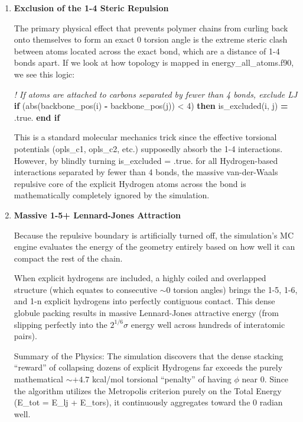 \documentclass[
]{article}
\newenvironment{Shaded}{}{}
\newcommand{\BuiltInTok}[1]{\textcolor[rgb]{0.00,0.50,0.00}{#1}}
\newcommand{\CommentTok}[1]{\textcolor[rgb]{0.38,0.63,0.69}{\textit{#1}}}
\newcommand{\ConstantTok}[1]{\textcolor[rgb]{0.53,0.00,0.00}{#1}}
\newcommand{\DecValTok}[1]{\textcolor[rgb]{0.25,0.63,0.44}{#1}}
\newcommand{\KeywordTok}[1]{\textcolor[rgb]{0.00,0.44,0.13}{\textbf{#1}}}
\newcommand{\NormalTok}[1]{#1}
\newcommand{\OperatorTok}[1]{\textcolor[rgb]{0.40,0.40,0.40}{#1}}
\begin{document}
\begin{enumerate}
\def\labelenumi{\arabic{enumi}.}
\item
  \textbf{Exclusion of the 1-4 Steric Repulsion}

  The primary physical effect that prevents polymer chains from curling
  back onto themselves to form an exact \(0\) torsion angle is the
  extreme steric clash between atoms located across the exact bond,
  which are a distance of 1-4 bonds apart. If we look at how topology is
  mapped in energy\_all\_atoms.f90, we see this logic:

\begin{Shaded}
\begin{Highlighting}[]
\CommentTok{! If atoms are attached to carbons separated by fewer than 4 bonds, exclude LJ}
\KeywordTok{if}\NormalTok{ (}\BuiltInTok{abs}\NormalTok{(backbone\_pos(i) }\KeywordTok{{-}}\NormalTok{ backbone\_pos(j)) }\OperatorTok{\textless{}} \DecValTok{4}\NormalTok{) }\KeywordTok{then}
\NormalTok{  is\_excluded(i, j) }\KeywordTok{=} \ConstantTok{.true.}
\KeywordTok{end if}
\end{Highlighting}
\end{Shaded}

  This is a standard molecular mechanics trick since the effective
  torsional potentials (opls\_c1, opls\_c2, etc.) supposedly absorb the
  1-4 interactions. However, by blindly turning is\_excluded = .true.
  for all Hydrogen-based interactions separated by fewer than 4 bonds,
  the massive van-der-Waals repulsive core of the explicit Hydrogen
  atoms across the bond is mathematically completely ignored by the
  simulation.
\item
  \textbf{Massive 1-5+ Lennard-Jones Attraction}

  Because the repulsive boundary is artificially turned off, the
  simulation's MC engine evaluates the energy of the geometry entirely
  based on how well it can compact the rest of the chain.

  When explicit hydrogens are included, a highly coiled and overlapped
  structure (which equates to consecutive \(\sim 0\) torsion angles)
  brings the 1-5, 1-6, and 1-n explicit hydrogens into perfectly
  contiguous contact. This dense globule packing results in massive
  Lennard-Jones attractive energy (from slipping perfectly into the
  \(2^{1/6}\sigma\) energy well across hundreds of interatomic pairs).

  Summary of the Physics: The simulation discovers that the dense
  stacking ``reward'' of collapsing dozens of explicit Hydrogens far
  exceeds the purely mathematical \(\sim +4.7\) kcal/mol torsional
  ``penalty'' of having \(\phi\) near \(0\). Since the algorithm
  utilizes the Metropolis criterion purely on the Total Energy (E\_tot =
  E\_lj + E\_tors), it continuously aggregates toward the \(0\) radian
  well.


\end{enumerate}
\end{document}
